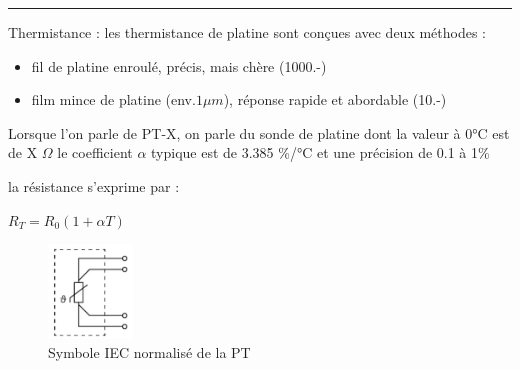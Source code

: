 \documentclass[	DIV=calc,%
							paper=a4,%
							fontsize=11pt,%
							twocolumn]{scrartcl} %
\newcommand{\hformbar}[1]{\bigskip\hrule\vspace{5pt}} %
\newcounter{mycounter}
\newcommand{\formdesc}[1]{\noindent\textbf{#1} \addtocounter{mycounter}{1} \hfill \themycounter}
\begin{document}
\hformbar

\formdesc{Capteur résistif}

Thermistance :
les thermistance de platine sont conçues avec deux méthodes : 
\begin{itemize}
    \item fil de platine enroulé, précis, mais chère (1000.-)
    \item film mince de platine (env.$1\mu m$), réponse rapide et abordable (10.-)
\end{itemize}
Lorsque l'on parle de PT-X,  on parle du sonde de platine dont la valeur à 0°C est de X $\Omega$
le coefficient $\alpha$ typique est de 3.385 \%/°C et une précision de 0.1 à 1\%

la résistance s'exprime par :

{\hfill $R_{T} = R_0 (1+\alpha T)$ \hfill}

\begin{figure}[H]
    \begin{center}
        \includegraphics[width=0.2\textwidth]{img/PT.JPG}
        \caption{Symbole IEC normalisé de la PT}
        \label{fig:symbole_PT}
    \end{center}
\end{figure}
\end{document}
